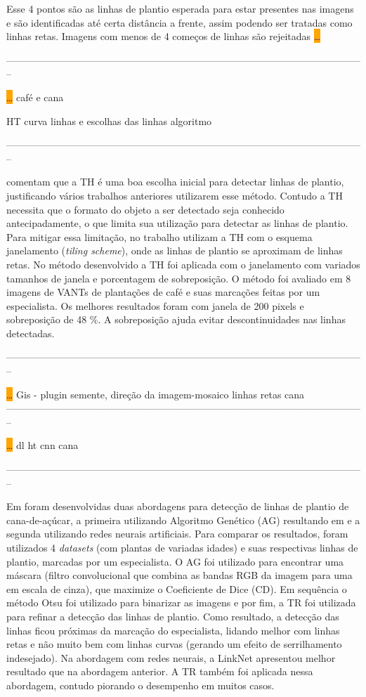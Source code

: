 \documentclass[12pt, a4paper, english, brazil]{article}
\newcommand{\textRed}[1]{{{\color{red} #1}}}
\newcommand{\dotsBlue}{\colorbox{orange}{\textcolor{blue}{\dots}}}
\newcommand{\linePage}{--------------------------------------------------------------------------------------------------------------}
\begin{document}
\textRed{Esse 4 pontos são as linhas de plantio esperada para estar presentes nas imagens e são identificadas até certa distância a frente, assim podendo ser tratadas como linhas retas. Imagens com menos de 4 começos de linhas são rejeitadas} \dotsBlue

\linePage

 \dotsBlue
café e cana

HT
curva
linhas e escolhas das linhas
algoritmo

\linePage

 comentam que a TH é uma boa escolha inicial para detectar linhas de plantio, justificando vários trabalhos anteriores utilizarem esse método. Contudo a TH necessita que o formato do objeto a ser detectado seja conhecido antecipadamente, o que limita sua utilização para detectar as linhas de plantio. Para mitigar essa limitação, no trabalho utilizam a TH com o esquema janelamento (\textit{tiling scheme}), onde as linhas de plantio se aproximam de linhas retas. No método desenvolvido a TH foi aplicada com o janelamento com variados tamanhos de janela e porcentagem de sobreposição. O método foi avaliado em 8 imagens de VANTs de plantações de café e suas marcações feitas por um especialista. Os melhores resultados foram com janela de 200 pixels e sobreposição de 48 \%. A sobreposição ajuda evitar descontinuidades nas linhas detectadas.

\linePage

 \dotsBlue
Gis - plugin
semente, direção da imagem-mosaico
linhas retas
cana
\linePage

 \dotsBlue
dl
ht
cnn
cana

\linePage

Em  foram desenvolvidas duas abordagens para detecção de linhas de plantio de cana-de-açúcar, a primeira utilizando Algoritmo Genético (AG) resultando em  e a segunda utilizando redes neurais artificiais. Para comparar os resultados, foram utilizados 4 \textit{datasets} (com plantas de variadas idades) e suas respectivas linhas de plantio, marcadas por um especialista. O AG foi utilizado para encontrar uma máscara (filtro convolucional que combina as bandas RGB da imagem para uma em escala de cinza), que maximize o Coeficiente de Dice (CD). Em sequência o método Otsu foi utilizado para binarizar as imagens e por fim, a TR foi utilizada para refinar a detecção das linhas de plantio. Como resultado, a detecção das linhas ficou próximas da marcação do especialista, lidando melhor com linhas retas e não muito bem com linhas curvas (gerando um efeito de serrilhamento indesejado). Na abordagem com redes neurais, a LinkNet apresentou melhor resultado que na abordagem anterior. A TR também foi aplicada nessa abordagem, contudo piorando o desempenho em muitos casos.
\end{document}
